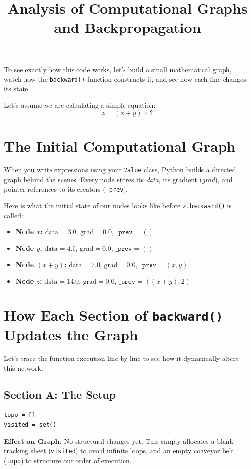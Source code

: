\documentclass[11pt,a4paper]{article}
\title{\textbf{Analysis of Computational Graphs and Backpropagation}}
\author{}
\date{}
\begin{document}
\maketitle

To see exactly how this code works, let’s build a small mathematical graph, watch how the \texttt{backward()} function constructs it, and see how each line changes its state.

Let’s assume we are calculating a simple equation: 
\begin{equation*}
    z = (x + y) \times 2
\end{equation*}

\section{The Initial Computational Graph}
When you write expressions using your \texttt{Value} class, Python builds a directed graph behind the scenes. Every node stores its \textit{data}, its gradient (\textit{grad}), and pointer references to its creators (\texttt{\_prev}).

Here is what the initial state of our nodes looks like before \texttt{z.backward()} is called:
\begin{itemize}
    \item \textbf{Node $x$:} $\text{data}=3.0$, $\text{grad}=0.0$, $\texttt{\_prev}=()$
    \item \textbf{Node $y$:} $\text{data}=4.0$, $\text{grad}=0.0$, $\texttt{\_prev}=()$
    \item \textbf{Node $(x+y)$:} $\text{data}=7.0$, $\text{grad}=0.0$, $\texttt{\_prev}=(x, y)$
    \item \textbf{Node $z$:} $\text{data}=14.0$, $\text{grad}=0.0$, $\texttt{\_prev}=((x+y), 2)$
\end{itemize}

\section{How Each Section of \texttt{backward()} Updates the Graph}
Let's trace the function execution line-by-line to see how it dynamically alters this network.

\subsection*{Section A: The Setup}
\begin{lstlisting}
topo = []
visited = set()
\end{lstlisting}
\textbf{Effect on Graph:} No structural changes yet. This simply allocates a blank tracking sheet (\texttt{visited}) to avoid infinite loops, and an empty conveyor belt (\texttt{topo}) to structure our order of execution.
\end{document}
